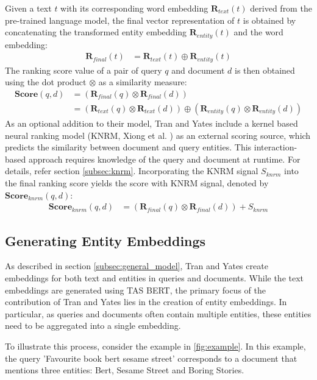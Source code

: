 Given a text $t$ with its corresponding word embedding $\mathbf{R}_{text}(t)$ derived from the pre-trained language model, the final vector representation of $t$ is obtained by concatenating the transformed entity embedding $\mathbf{R}_{entity}(t)$ and the word embedding:
\begin{align}
\mathbf{R}_{final}(t) &= \mathbf{R}_{text}(t) \oplus \mathbf{R}_{entity}(t)
\end{align}
The ranking score value of a pair of query $q$ and document $d$ is then obtained using the dot product $\otimes$ as a similarity measure:
\begin{align}
    \mathbf{Score}(q,d) &= \left( \mathbf{R}_{final}(q) \otimes \mathbf{R}_{final}(d) \right) \\
    &= \left( \mathbf{R}_{text}(q) \otimes \mathbf{R}_{text}(d) \right) \oplus \left( \mathbf{R}_{entity}(q) \otimes \mathbf{R}_{entity}(d) \right)
\end{align}
As an optional addition to their model, Tran and Yates include a kernel based neural ranking model (KNRM, Xiong et al. \cite{xiong2017end}) as an external scoring source, which predicts the similarity between document and query entities. This interaction-based approach requires knowledge of the query and document at runtime. For details, refer section \ref{subsec:knrm}. Incorporating the KNRM signal $S_{knrm}$ into the final ranking score yields the score with KNRM signal, denoted by $\mathbf{Score}_{knrm}(q,d)$:
\begin{align}
    \mathbf{Score}_{knrm}(q,d) &= \left( \mathbf{R}_{final}(q) \otimes \mathbf{R}_{final}(d) \right) + S_{knrm} \label{eq:score_knrm}
\end{align}
\subsection{Generating Entity Embeddings\label{subsec:entity_embeddings}}
As described in section \ref{subsec:general_model}, Tran and Yates create embeddings for both text and entities in queries and documents. While the text embeddings are generated using TAS BERT, the primary focus of the contribution of Tran and Yates lies in the creation of entity embeddings. In particular, as queries and documents often contain multiple entities, these entities need to be aggregated into a single embedding.

To illustrate this process, consider the example in \autoref{fig:example}. In this example, the query 'Favourite book bert sesame street' corresponds to a document that mentions three entities: Bert, Sesame Street and Boring Stories.

